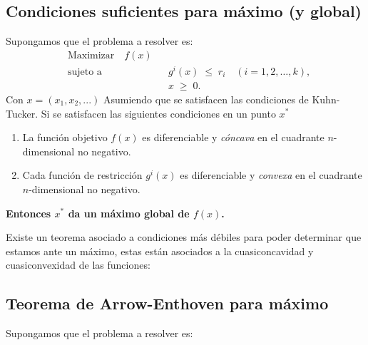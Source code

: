 \documentclass{article}
\begin{document}
\subsection*{Condiciones suficientes para máximo (y global)}
Supongamos que el problema a resolver es:
\[
\begin{aligned}
&\text{Maximizar} \quad  f(x) \\
&\text{sujeto a} \quad && g^{i}(x) \;\le\; r_{i}
\quad (i = 1,2,\dots,k),\\
& && x \;\ge\; 0.
\end{aligned}
\]
Con $x=(x_1,x_2,...)$
Asumiendo que se satisfacen las condiciones de Kuhn-Tucker.
Si se satisfacen las siguientes condiciones en un punto $x^*$
\begin{enumerate}\color{teal}
  \item La función objetivo \(f(x)\) es diferenciable y \emph{cóncava} en el cuadrante \(n\)-dimensional no negativo.
  \item Cada función de restricción \(g^{i}(x)\) es diferenciable y \emph{convexa} en el cuadrante \(n\)-dimensional no negativo.
\end{enumerate}
\textbf{\color{teal}Entonces \(x^{*}\) da un máximo global de \(f(x)\).}


Existe un teorema asociado a condiciones más débiles para poder determinar que estamos ante un máximo, estas están asociados a la cuasiconcavidad y cuasiconvexidad de las funciones:
\subsection*{Teorema de Arrow-Enthoven para máximo}
Supongamos que el problema a resolver es:
\end{document}

